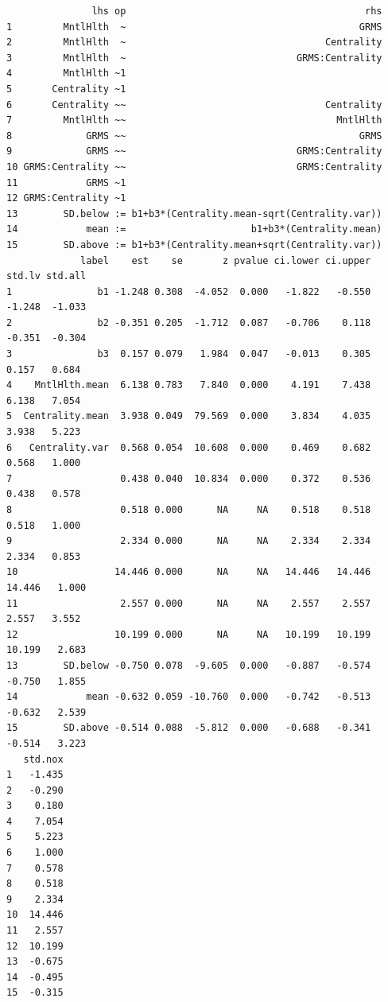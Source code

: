 \documentclass[
  11pt,
]{book}
\begin{document}
\begin{verbatim}
               lhs op                                          rhs
1         MntlHlth  ~                                         GRMS
2         MntlHlth  ~                                   Centrality
3         MntlHlth  ~                              GRMS:Centrality
4         MntlHlth ~1                                             
5       Centrality ~1                                             
6       Centrality ~~                                   Centrality
7         MntlHlth ~~                                     MntlHlth
8             GRMS ~~                                         GRMS
9             GRMS ~~                              GRMS:Centrality
10 GRMS:Centrality ~~                              GRMS:Centrality
11            GRMS ~1                                             
12 GRMS:Centrality ~1                                             
13        SD.below := b1+b3*(Centrality.mean-sqrt(Centrality.var))
14            mean :=                      b1+b3*(Centrality.mean)
15        SD.above := b1+b3*(Centrality.mean+sqrt(Centrality.var))
             label    est    se       z pvalue ci.lower ci.upper std.lv std.all
1               b1 -1.248 0.308  -4.052  0.000   -1.822   -0.550 -1.248  -1.033
2               b2 -0.351 0.205  -1.712  0.087   -0.706    0.118 -0.351  -0.304
3               b3  0.157 0.079   1.984  0.047   -0.013    0.305  0.157   0.684
4    MntlHlth.mean  6.138 0.783   7.840  0.000    4.191    7.438  6.138   7.054
5  Centrality.mean  3.938 0.049  79.569  0.000    3.834    4.035  3.938   5.223
6   Centrality.var  0.568 0.054  10.608  0.000    0.469    0.682  0.568   1.000
7                   0.438 0.040  10.834  0.000    0.372    0.536  0.438   0.578
8                   0.518 0.000      NA     NA    0.518    0.518  0.518   1.000
9                   2.334 0.000      NA     NA    2.334    2.334  2.334   0.853
10                 14.446 0.000      NA     NA   14.446   14.446 14.446   1.000
11                  2.557 0.000      NA     NA    2.557    2.557  2.557   3.552
12                 10.199 0.000      NA     NA   10.199   10.199 10.199   2.683
13        SD.below -0.750 0.078  -9.605  0.000   -0.887   -0.574 -0.750   1.855
14            mean -0.632 0.059 -10.760  0.000   -0.742   -0.513 -0.632   2.539
15        SD.above -0.514 0.088  -5.812  0.000   -0.688   -0.341 -0.514   3.223
   std.nox
1   -1.435
2   -0.290
3    0.180
4    7.054
5    5.223
6    1.000
7    0.578
8    0.518
9    2.334
10  14.446
11   2.557
12  10.199
13  -0.675
14  -0.495
15  -0.315
\end{verbatim}
\end{document}
